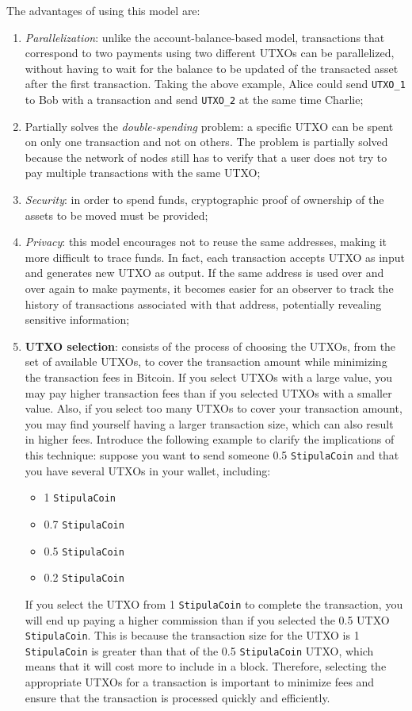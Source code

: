 The advantages of using this model are:
\begin{enumerate}
	\item \textit{Parallelization}\label{utxo-parallelization}: unlike the account-balance-based model, 
	transactions that correspond to two payments using two different UTXOs can be parallelized, without having 
	to wait for the balance to be updated of the transacted asset after the first transaction. Taking the 
	above example, Alice could send \verb|UTXO_1| to Bob with a transaction and send \verb|UTXO_2| at the same 
	time Charlie;
	\item Partially solves the \textit{double-spending} problem: a specific UTXO can be spent on only one 
	transaction and not on others. The problem is partially solved because the network of nodes still has to 
	verify that a user does not try to pay multiple transactions with the same UTXO;
	\item \textit{Security}: in order to spend funds, cryptographic proof of ownership of the assets to be 
	moved must be provided;
	\item \textit{Privacy}: this model encourages not to reuse the same addresses, making it more difficult 
	to trace funds. In fact, each transaction accepts UTXO as input and generates new UTXO as output. If the 
	same address is used over and over again to make payments, it becomes easier for an observer to track the 
	history of transactions associated with that address, potentially revealing sensitive information;
	\item \textbf{UTXO selection}\label{coin-selection}: consists of the process of choosing the UTXOs, from 
	the set of available UTXOs, to cover the transaction amount while minimizing the transaction fees in 
	Bitcoin. If you select UTXOs with a large value, you may pay higher transaction fees than if you selected 
	UTXOs with a smaller value. Also, if you select too many UTXOs to cover your transaction amount, you may 
	find yourself having a larger transaction size, which can also result in higher fees. Introduce the 
	following example to clarify the implications of this technique: suppose you want to send someone 0.5 
	\verb|StipulaCoin| and that you have several UTXOs in your wallet, including:
	\begin{itemize}
		\item 1 \verb|StipulaCoin|
		\item 0.7 \verb|StipulaCoin|
		\item 0.5 \verb|StipulaCoin|
		\item 0.2 \verb|StipulaCoin|
	\end{itemize}

If you select the UTXO from 1 \verb|StipulaCoin| to complete the transaction, you will end up paying a 
higher commission than if you selected the 0.5 UTXO \verb|StipulaCoin|. This is because the transaction 
size for the UTXO is 1 \verb|StipulaCoin| is greater than that of the 0.5 \verb|StipulaCoin| UTXO, which 
means that it will cost more to include in a block. Therefore, selecting the appropriate UTXOs for a 
transaction is important to minimize fees and ensure that the transaction is processed quickly and 
efficiently.
\end{enumerate}

